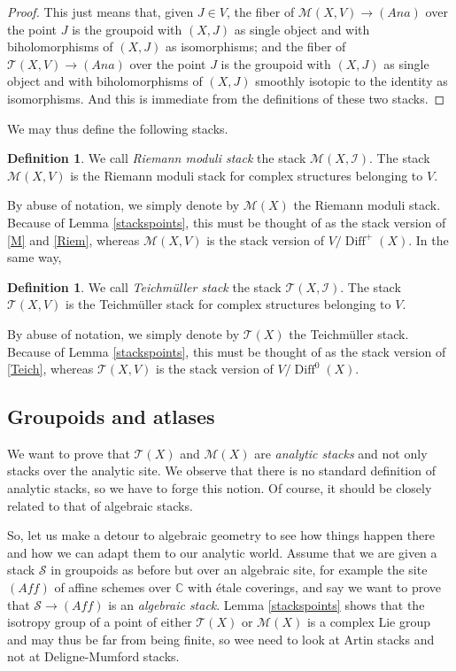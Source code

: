 \documentclass[JEP,XML,SOM,Unicode]{cedram}
\let\mathcal\mathscr
\newcommand{\Aff}{\mathit{Aff}}
\newcommand{\Ana}{\mathit{Ana}}
\DeclareMathOperator{\Diff}{Diff}
\theoremstyle{plain}
\theoremstyle{definition}
\newtheorem{definition}[theorem]{Definition}
\theoremstyle{remark}
\numberwithin{equation}{section}
\newcommand{\CC}{{\mathbb{C}}}
\newcommand{\T}{\mathcal T(X)}
\newcommand{\cI}{\mathcal{I}}
\begin{document}
\begin{proof}
This just means that, given $J\in V$, the fiber of $\mathcal M(X,V)\to(\Ana)$ over the point $J$ is the groupoid with $(X,J)$ as single object and with biholomorphisms of $(X,J)$ as isomorphisms; and the fiber of $\mathcal T(X,V)\to(\Ana)$ over the point $J$ is the groupoid with $(X,J)$ as single object and with biholomorphisms of $(X,J)$ smoothly isotopic to the identity as isomorphisms. And this is immediate from the definitions of these two stacks.
\end{proof}
We may thus define the following stacks.
\begin{definition}
\label{RMS}
We call \emph{Riemann moduli stack} the stack $\mathcal M(X,\cI)$. The stack $\mathcal M(X, V)$ is the Riemann moduli stack for complex structures belonging to $V$.
\end{definition}

By abuse of notation, we simply denote by $\mathcal M(X)$ the Riemann moduli stack. Because of Lemma \ref{stackspoints}, this must be thought of as the stack version of \eqref{M} and \eqref{Riem}, whereas $\mathcal M(X, V)$ is the stack version of $V/\Diff^+(X)$. In the same way,

\begin{definition}
\label{TMS}
We call \emph{Teichmüller stack} the stack $\mathcal T(X,\cI)$. The stack $\mathcal T(X, V)$ is the Teichmüller stack for complex structures belonging to $V$.
\end{definition}

By abuse of notation, we simply denote by $\mathcal T(X)$ the Teichmüller stack. Because of Lemma \ref{stackspoints}, this must be thought of as the stack version of \eqref{Teich}, whereas $\mathcal T(X, V)$ is the stack version of $V/\Diff^0(X)$.

\subsection{Groupoids and atlases}
\label{groupoidatlas}
We want to prove that $\T$ and $\mathcal M(X)$ are \emph{analytic stacks} and not only stacks over the analytic site. We observe that there is no standard definition of analytic stacks, so we have to forge this notion. Of course, it should be closely related to that of algebraic stacks.

So, let us make a detour to algebraic geometry to see how things happen there and how we can adapt them to our analytic world. Assume that we are given a stack $\mathcal S$ in groupoids as before but over an algebraic site, for example the site $(\Aff)$ of affine schemes over $\CC$ with étale coverings, and say we want to
prove that $\mathcal S\to (\Aff)$ is an \emph{algebraic stack}. Lemma \ref{stackspoints} shows that the isotropy group of a point of either $\T$ or $\mathcal M(X)$ is a complex Lie group and may thus be far from being finite, so wee need to look at Artin stacks and not at Deligne-Mumford stacks.
\end{document}

